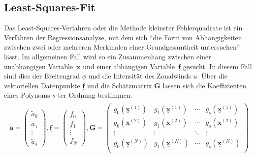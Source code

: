 \subsection{Least-Squares-Fit}
Das Least-Squares-Verfahren oder die Methode kleinster Fehlerquadrate ist ein Verfahren der Regressionsanalyse, mit dem sich \enquote{die Form von Abhängigkeiten zwischen zwei  oder mehreren Merkmalen einer Grundgesamtheit untersuchen}~\citep{bronstein-2006} lässt. Im allgemeinen Fall wird so ein Zusammenhang zwischen einer unabhängigen Variable~$\underline{\boldsymbol{x}}$ und einer abhängigen Variable~$\underline{\boldsymbol{f}}$ gesucht. In diesem Fall sind dies der Breitengrad $\phi$ und die Intensität des Zonalwinds $u$. Über die vektoriellen Datenpunkte $\underline{\boldsymbol{f}}$ und die Schätzmatrix $\boldsymbol{G}$ lassen sich die Koeffizienten eines Polynoms $s$-ter Ordnung bestimmen.  
\begin{align}
\begin{split}
\underline{\boldsymbol{\tilde{a}}} = 
\begin{pmatrix}
  \tilde{a}_0 \\
  \tilde{a}_1 \\
  \vdots \\
  \tilde{a}_s
\end{pmatrix},
\underline{\boldsymbol{f}} = 
\begin{pmatrix}
  f_0 \\
  f_1 \\
  \vdots \\
  f_N
\end{pmatrix},
\boldsymbol{G} = 
 \begin{pmatrix}
  g_{0} \left( \underline{\boldsymbol{x}}^{\left( 1 \right)} \right) & g_{1} \left( \underline{\boldsymbol{x}}^{\left( 1 \right)} \right) & \cdots & g_{s} \left( \underline{\boldsymbol{x}}^{\left( 1 \right)} \right) \\
  g_{0} \left( \underline{\boldsymbol{x}}^{\left( 2 \right)} \right) & g_{1} \left( \underline{\boldsymbol{x}}^{\left( 2 \right)} \right) & \cdots & g_{s} \left( \underline{\boldsymbol{x}}^{\left( 2 \right)} \right) \\
  \vdots  & \vdots  & \ddots & \vdots  \\
  g_{0} \left( \underline{\boldsymbol{x}}^{\left( N \right)} \right) & g_{1} \left( \underline{\boldsymbol{x}}^{\left( N \right)} \right) & \cdots & g_{s} \left( \underline{\boldsymbol{x}}^{\left( N \right)} \right) \\
 \end{pmatrix}
\end{split}
\end{align}


